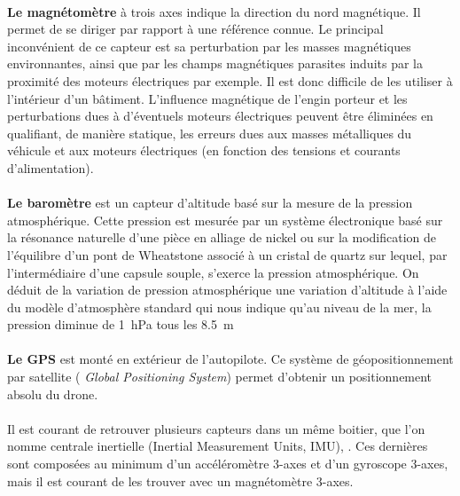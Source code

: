  \paragraph*{}
 \textbf{Le magnétomètre} à trois axes indique la direction du nord magnétique. Il permet de se diriger par rapport à une référence connue. Le principal inconvénient de ce capteur est sa perturbation par les masses magnétiques environnantes, ainsi que par les champs magnétiques parasites induits par la proximité des moteurs électriques par exemple. Il est donc difficile de les utiliser à l'intérieur d'un bâtiment. L'influence magnétique de l'engin porteur et les perturbations dues à d'éventuels moteurs électriques peuvent être éliminées en qualifiant, de manière statique, les erreurs dues aux masses métalliques du véhicule et aux moteurs électriques (en fonction des tensions et courants d'alimentation).

 \paragraph*{}

 \textbf{Le baromètre} est un capteur d'altitude basé sur la mesure de la pression atmosphérique. Cette pression est mesurée par un système électronique basé sur la résonance naturelle d'une pièce en alliage de nickel ou sur la modification de l'équilibre d'un pont de Wheatstone associé à un cristal de quartz sur lequel, par l'intermédiaire d'une capsule souple, s'exerce la pression atmosphérique. On déduit de la variation de pression atmosphérique une variation d'altitude à l'aide du modèle d'atmosphère standard qui nous indique qu'au niveau de la mer, la pression diminue de \SI{1}{\hecto\pascal} tous les \SI{8.5}{\meter}
 

 \paragraph*{}
 \textbf{Le GPS} est monté en extérieur de l'autopilote. Ce système de géopositionnement par satellite (\textit{ Global Positioning System})  permet d'obtenir un positionnement absolu du drone. 


 \paragraph*{}
 Il est courant de retrouver plusieurs capteurs dans un même boitier, que l'on nomme centrale inertielle (Inertial Measurement Units, IMU), . Ces dernières sont composées au minimum d'un accéléromètre 3-axes et d'un gyroscope 3-axes, mais il est courant de les trouver avec un magnétomètre 3-axes. 

